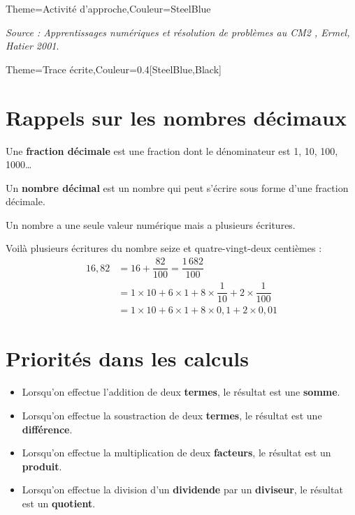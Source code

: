 \begin{Maquette}[Cours]{Theme={Activité d'approche},Couleur={SteelBlue}}
\begin{AActivite}
      \end{AActivite}

   \vfill\hfill{\it\footnotesize Source : \og Apprentissages numériques et résolution de problèmes au CM2 \fg, Ermel, Hatier 2001}.

\end{Maquette}



\begin{Maquette}[Cours]{Theme={Trace écrite},Couleur={0.4[SteelBlue,Black]}}

   \section{Rappels sur les nombres décimaux} %

      \begin{definition*}{}
         Une {\bf fraction décimale} est une fraction dont le dénominateur est  1, 10, 100, \num{1000}\dots \par
         Un {\bf nombre décimal} est un nombre qui peut s'écrire sous forme d'une fraction décimale.
      \end{definition*}

      Un nombre a une seule valeur numérique mais a plusieurs écritures.
        
      \begin{exemple*}{}
         Voilà plusieurs écritures du nombre seize et quatre-vingt-deux centièmes :
         \begin{align*}
            16,82 & =16+\dfrac{82}{100} =\dfrac{1\,682}{100} \\
            & =1\times10+6\times1+8\times\dfrac{1}{10}+2\times\dfrac{1}{100} \\
            & =1\times10+6\times1+8\times0,1+2\times0,01
         \end{align*}
      \end{exemple*}

   \section{Priorités dans les calculs}

      \begin{definition*}{}
         \begin{itemize}
            \item Lorsqu'on effectue l'addition de deux {\bf termes}, le résultat est une {\bf somme}.
            \item Lorsqu'on effectue la soustraction de deux {\bf termes}, le résultat est une {\bf différence}.
            \item Lorsqu'on effectue la multiplication de deux {\bf facteurs}, le résultat est un {\bf produit}.
            \item Lorsqu'on effectue la division d'un {\bf dividende} par un {\bf diviseur}, le résultat est un {\bf quotient}.
         \end{itemize}
      \end{definition*}


\end{Maquette}
